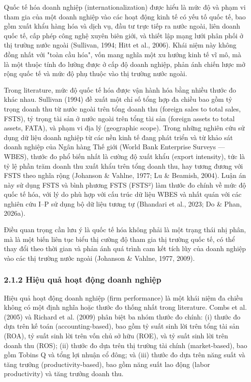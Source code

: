 \documentclass[12pt,a4paper]{article}
\begin{document}
Quốc tế hóa doanh nghiệp (internationalization) được hiểu là mức độ và
phạm vi tham gia của một doanh nghiệp vào các hoạt động kinh tế có yếu
tố quốc tế, bao gồm xuất khẩu hàng hóa và dịch vụ, đầu tư trực tiếp ra
nước ngoài, liên doanh quốc tế, cấp phép công nghệ xuyên biên giới, và
thiết lập mạng lưới phân phối ở thị trường nước ngoài (Sullivan, 1994;
Hitt et al., 2006). Khái niệm này không đồng nhất với "toàn cầu hóa",
vốn mang nghĩa một xu hướng kinh tế vĩ mô, mà là một thuộc tính đo lường
được ở cấp độ doanh nghiệp, phản ánh chiến lược mở rộng quốc tế và mức
độ phụ thuộc vào thị trường nước ngoài.

Trong literature, mức độ quốc tế hóa được vận hành hóa bằng nhiều thước
đo khác nhau. Sullivan (1994) đề xuất một chỉ số tổng hợp đa chiều bao
gồm tỷ trọng doanh thu từ nước ngoài trên tổng doanh thu (foreign sales
to total sales, FSTS), tỷ trọng tài sản ở nước ngoài trên tổng tài sản
(foreign assets to total assets, FATA), và phạm vi địa lý (geographic
scope). Trong những nghiên cứu sử dụng dữ liệu doanh nghiệp từ các nền
kinh tế đang phát triển và từ khảo sát doanh nghiệp của Ngân hàng Thế
giới (World Bank Enterprise Surveys --- WBES), thước đo phổ biến nhất là
cường độ xuất khẩu (export intensity), tức là tỷ lệ phần trăm doanh thu
xuất khẩu trên tổng doanh thu, hay tương đương với FSTS theo nghĩa rộng
(Johanson \& Vahlne, 1977; Lu \& Beamish, 2004). Luận án này sử dụng
FSTS và bình phương FSTS (FSTS²) làm thước đo chính về mức độ quốc tế
hóa, với lý do phù hợp với cấu trúc dữ liệu WBES và nhất quán với các
nghiên cứu I--P sử dụng bộ dữ liệu tương tự (Bhandari et al., 2023; Do
\& Phan, 2026a).

Điều quan trọng cần lưu ý là quốc tế hóa không phải là một trạng thái
nhị phân, mà là một biến liên tục biểu thị cường độ tham gia thị trường
quốc tế, có thể thay đổi theo thời gian và phản ánh quá trình cam kết
tích lũy của doanh nghiệp vào các thị trường nước ngoài (Johanson \&
Vahlne, 1977, 2009).

\hypertarget{212-hiux1ec7u-quux1ea3-houx1ea1t-ux111ux1ed9ng-doanh-nghiux1ec7p}{%
\subsubsection{2.1.2 Hiệu quả hoạt động doanh
nghiệp}\label{212-hiux1ec7u-quux1ea3-houx1ea1t-ux111ux1ed9ng-doanh-nghiux1ec7p}}

Hiệu quả hoạt động doanh nghiệp (firm performance) là một khái niệm đa
chiều không có một định nghĩa hoặc thước đo thống nhất trong literature.
Combs et al. (2005) và Richard et al. (2009) phân biệt ba nhóm thước đo
chính: (i) thước đo dựa trên kế toán (accounting-based), bao gồm tỷ suất
sinh lời trên tổng tài sản (ROA), tỷ suất sinh lời trên vốn chủ sở hữu
(ROE), và tỷ suất sinh lời trên doanh thu (ROS); (ii) thước đo dựa trên
thị trường tài chính (market-based), bao gồm Tobin\textquotesingle s Q
và tổng lợi nhuận cổ đông; và (iii) thước đo dựa trên năng suất và tăng
trưởng (productivity-based), bao gồm năng suất lao động (labor
productivity) và tăng trưởng doanh thu.
\end{document}
